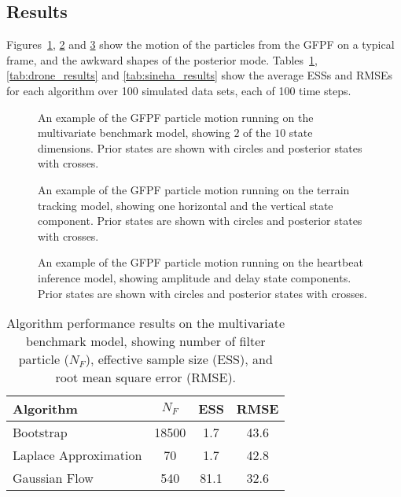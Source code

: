 \documentclass{article}
\begin{document}
\subsection{Results}

Figures~\ref{fig:nlng_example_frame}, \ref{fig:drone_example_frame_deterministic} and \ref{fig:sineha_example_frame} show the motion of the particles from the GFPF on a typical frame, and the awkward shapes of the posterior mode. Tables~\ref{tab:nlng_results}, \ref{tab:drone_results} and \ref{tab:sineha_results} show the average ESSs and RMSEs for each algorithm over 100 simulated data sets, each of 100 time steps.

\begin{figure}
\centering

\caption{An example of the GFPF particle motion running on the multivariate benchmark model, showing $2$ of the $10$ state dimensions. Prior states are shown with circles and posterior states with crosses.}
\label{fig:nlng_example_frame}
\end{figure}

\begin{figure}
\centering

\caption{An example of the GFPF particle motion running on the terrain tracking model, showing one horizontal and the vertical state component. Prior states are shown with circles and posterior states with crosses.}
\label{fig:drone_example_frame_deterministic}
\end{figure}

\begin{figure}
\centering

\caption{An example of the GFPF particle motion running on the heartbeat inference model, showing amplitude and delay state components. Prior states are shown with circles and posterior states with crosses.}
\label{fig:sineha_example_frame}
\end{figure}

\begin{table}
\centering
\begin{tabular}{l||c|c|c}
Algorithm                                & $N_F$ & ESS  & RMSE \\
\hline
Bootstrap                                & 18500 &  1.7 & 43.6 \\
Laplace Approximation                    &    70 &  1.7 & 42.8 \\
Gaussian Flow                            &   540 & 81.1 & 32.6 \\
\end{tabular}
\caption{Algorithm performance results on the multivariate benchmark model, showing number of filter particle ($N_F$), effective sample size (ESS), and root mean square error (RMSE).}
\label{tab:nlng_results}
\end{table}
\end{document}
